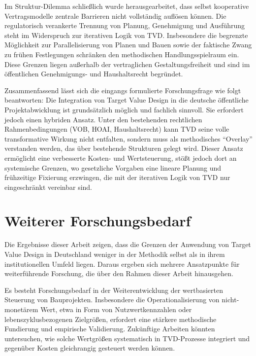 Im Struktur-Dilemma schließlich wurde herausgearbeitet, dass selbst kooperative Vertragsmodelle zentrale Barrieren nicht vollständig auflösen können. Die regulatorisch verankerte Trennung von Planung, Genehmigung und Ausführung steht im Widerspruch zur iterativen Logik von \acs{TVD}. Insbesondere die begrenzte Möglichkeit zur Parallelisierung von Planen und Bauen sowie der faktische Zwang zu frühen Festlegungen schränken den methodischen Handlungsspielraum ein. Diese Grenzen liegen außerhalb der vertraglichen Gestaltungsfreiheit und sind im öffentlichen Genehmigungs- und Haushaltsrecht begründet.

Zusammenfassend lässt sich die eingangs formulierte Forschungsfrage wie folgt beantworten: Die Integration von Target Value Design in die deutsche öffentliche Projektabwicklung ist grundsätzlich möglich und fachlich sinnvoll. Sie erfordert jedoch einen hybriden Ansatz. Unter den bestehenden rechtlichen Rahmenbedingungen (\acs{VOB}, \acs{HOAI}, Haushaltsrecht) kann \acs{TVD} seine volle transformative Wirkung nicht entfalten, sondern muss als methodisches \enquote{Overlay} verstanden werden, das über bestehende Strukturen gelegt wird. Dieser Ansatz ermöglicht eine verbesserte Kosten- und Wertsteuerung, stößt jedoch dort an systemische Grenzen, wo gesetzliche Vorgaben eine lineare Planung und frühzeitige Fixierung erzwingen, die mit der iterativen Logik von \acs{TVD} nur eingeschränkt vereinbar sind.

\section{Weiterer Forschungsbedarf}
\label{sec:6.2}

Die Ergebnisse dieser Arbeit zeigen, dass die Grenzen der Anwendung von Target Value Design in Deutschland weniger in der Methodik selbst als in ihrem institutionellen Umfeld liegen. Daraus ergeben sich mehrere Ansatzpunkte für weiterführende Forschung, die über den Rahmen dieser Arbeit hinausgehen.

Es besteht Forschungsbedarf in der Weiterentwicklung der wertbasierten Steuerung von Bauprojekten. Insbesondere die Operationalisierung von nicht-monetärem Wert, etwa in Form von Nutzwertkennzahlen oder lebenszyklusbezogenen Zielgrößen, erfordert eine stärkere methodische Fundierung und empirische Validierung. Zukünftige Arbeiten könnten untersuchen, wie solche Wertgrößen systematisch in \acs{TVD}-Prozesse integriert und gegenüber Kosten gleichrangig gesteuert werden können.

